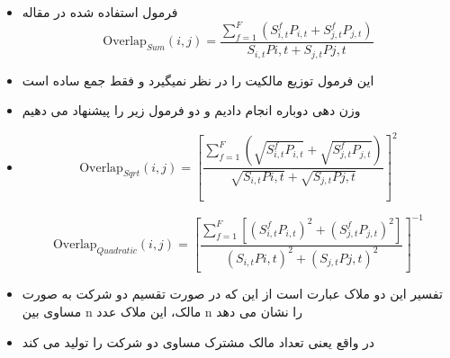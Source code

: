 \documentclass[12pt, a4paper]{article}
\begin{document}
\subsubsection{}

\begin{itemize}
	\item 
	فرمول استفاده شده در مقاله
		\begin{equation}
		\text{Overlap}_{Sum}(i, j) = \frac{\sum_{f = 1}^{F} (S^f_{i,t}P_{i,t}+S^f_{j,t}P_{j,t})}{S_{i,t}P{i,t} + S_{j,t}P{j,t}}
		\label{Sum}
	\end{equation}
	\item 
	این فرمول توزیع مالکیت را در نظر نمیگیرد و فقط جمع ساده است
	\item
وزن دهی دوباره انجام دادیم و دو فرمول زیر را پیشنهاد می دهیم	
	\item

\begin{equation}
	\text{Overlap}_{Sqrt}(i, j) =  [\frac{\sum_{f =1}^{F}(\sqrt{S^f_{i,t}P_{i,t}}+\sqrt{S^f_{j,t}P_{j,t}})}{\sqrt{S_{i,t}P{i,t}} + \sqrt{S_{j,t}P{j,t}}}]^2 
	\label{sqrt}
\end{equation}

\begin{equation}
	\text{Overlap}_{Quadratic}(i, j) =  [{\frac{\sum_{f = 1}^{F}[(S^f_{i,t}P_{i,t})^2+(S^f_{j,t}P_{j,t})^2]}{(S_{i,t}P{i,t})^2 + (S_{j,t}P{j,t})^2}}]^{-1}
	\label{Quadratic}
\end{equation}
	\item
تفسیر این دو ملاک عبارت است از این که در صورت تقسیم دو شرکت به صورت مساوی بین n مالک، این ملاک عدد n را نشان می دهد
	\item
در واقع یعنی تعداد مالک مشترک مساوی دو شرکت را تولید می کند
\end{itemize}
\end{document}
